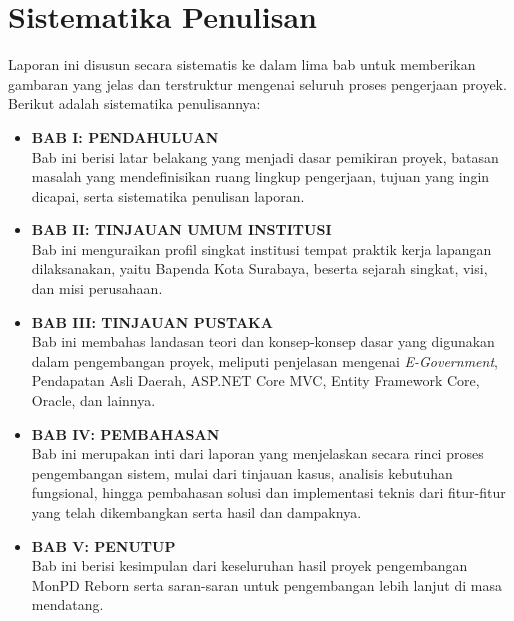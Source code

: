 \section{Sistematika Penulisan}
\label{sec:sistematikapenulisan}

Laporan ini disusun secara sistematis ke dalam lima bab untuk memberikan gambaran yang jelas dan terstruktur mengenai seluruh proses pengerjaan proyek. Berikut adalah sistematika penulisannya:
\begin{itemize}
    \item \textbf{BAB I: PENDAHULUAN}\\
    Bab ini berisi latar belakang yang menjadi dasar pemikiran proyek, batasan masalah yang mendefinisikan ruang lingkup pengerjaan, tujuan yang ingin dicapai, serta sistematika penulisan laporan.
    \item \textbf{BAB II: TINJAUAN UMUM INSTITUSI}\\
    Bab ini menguraikan profil singkat institusi tempat praktik kerja lapangan dilaksanakan, yaitu Bapenda Kota Surabaya, beserta sejarah singkat, visi, dan misi perusahaan.
    \item \textbf{BAB III: TINJAUAN PUSTAKA}\\
    Bab ini membahas landasan teori dan konsep-konsep dasar yang digunakan dalam pengembangan proyek, meliputi penjelasan mengenai \emph{E-Government}, Pendapatan Asli Daerah, ASP.NET Core MVC, Entity Framework Core, Oracle, dan lainnya.
    \item \textbf{BAB IV: PEMBAHASAN}\\
    Bab ini merupakan inti dari laporan yang menjelaskan secara rinci proses pengembangan sistem, mulai dari tinjauan kasus, analisis kebutuhan fungsional, hingga pembahasan solusi dan implementasi teknis dari fitur-fitur yang telah dikembangkan serta hasil dan dampaknya.
    \item \textbf{BAB V: PENUTUP}\\
    Bab ini berisi kesimpulan dari keseluruhan hasil proyek pengembangan MonPD Reborn serta saran-saran untuk pengembangan lebih lanjut di masa mendatang.
\end{itemize}
